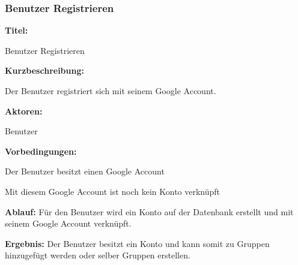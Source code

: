 \documentclass{scrartcl}
\begin{document}
	\subsubsection{Benutzer Registrieren}
	\begin{description}
		\item \textbf{Titel:}
		\begin{description}
			\item Benutzer Registrieren
		\end{description}
		\item \textbf{Kurzbeschreibung:}
		\begin{description}
			\item Der Benutzer registriert sich mit seinem Google Account.
		\end{description}
		\item \textbf{Aktoren:}
		\begin{description}
			\item Benutzer 
		\end{description}
		\item \textbf{Vorbedingungen:}
		\begin{description}
			\item Der Benutzer besitzt einen Google Account
			\item Mit diesem Google Account ist noch kein Konto verknüpft
		\end{description}
		\item \textbf{Ablauf:} \newline Für den Benutzer wird ein Konto auf der Datenbank erstellt und mit seinem Google Account verknüpft.
		\item \textbf{Ergebnis:} \newline Der Benutzer besitzt ein Konto und kann somit zu Gruppen hinzugefügt werden oder selber Gruppen erstellen.
	\end{description}
	
	\newpage
	
\end{document}
